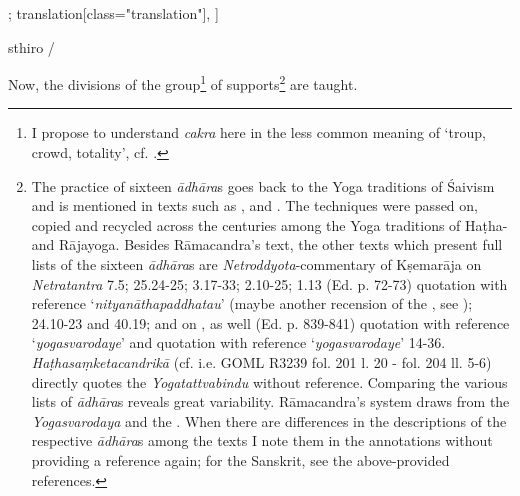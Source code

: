 \begin{alignment}[
  texts=edition[class="edition"];
  translation[class="translation"],
  ]
\begin{edition}
\begin{prose}[p30_01]
{  }
sthiro
/
\end{prose}
  \end{edition}
  \begin{translation}
    \begin{tlate}[p30_01]
      \noindent
      Now, the divisions of the group\footnote{I propose to understand \textit{cakra} here in the less common meaning of `troup, crowd, totality', cf. \citeauthor[vol. 2, 1958:209]{petersburger}.} of supports\footnote{The practice of sixteen \textit{ādhāra}s goes back to the Yoga traditions of Śaivism and is mentioned in texts such as ,  and . The techniques were passed on, copied and recycled across the centuries among the Yoga traditions of Haṭha- and Rājayoga. Besides Rāmacandra's text, the other texts which present full lists of the sixteen \textit{ādhāra}s are \textit{Netroddyota}-commentary of Kṣemarāja on \textit{Netratantra} 7.5;  25.24-25;  3.17-33;  2.10-25;  1.13 (Ed. p. 72-73) quotation with reference `\textit{nityanāthapaddhatau}' (maybe another recension of the , see \citeauthor[2023:149]{shivayogapradipika});  24.10-23 and 40.19; and  on , as well  (Ed. p. 839-841) quotation with reference `\textit{yogasvarodaye}' and  quotation with reference `\textit{yogasvarodaye}' 14-36. \textit{Haṭhasaṃketacandrikā} (cf. i.e. GOML R3239 fol. 201 l. 20 - fol. 204 ll. 5-6) directly quotes the \textit{Yogatattvabindu} without reference. Comparing the various lists of \textit{ādhāra}s reveals great variability. Rāmacandra's system draws from the \textit{Yogasvarodaya} and the . When there are differences in the descriptions of the respective \textit{ādhāra}s among the texts I note them in the annotations without providing a reference again; for the Sanskrit, see the above-provided references.} are taught.%
      

\end{tlate}
\end{translation}
\end{alignment}
